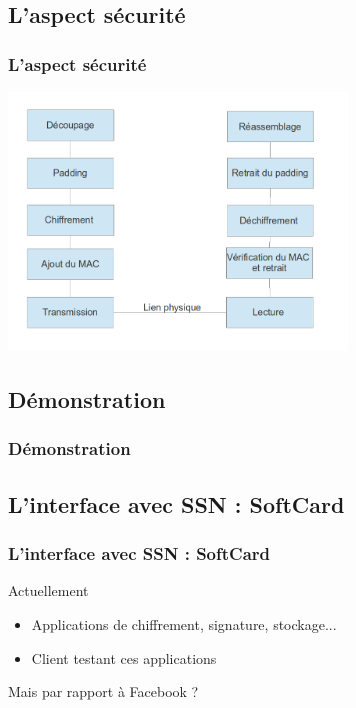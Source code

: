 \documentclass{beamer}
\begin{document}
\subsection{L'aspect sécurité}
\begin{frame}
    \frametitle{L'aspect sécurité}
    \includegraphics[width=9cm]{stack}
\end{frame}

\subsection{Démonstration}
\begin{frame}
    \frametitle{Démonstration}
    \begin{block}{}
    \end{block}
\end{frame}

\subsection{L'interface avec SSN : SoftCard}
\begin{frame}
    \frametitle{L'interface avec SSN : SoftCard}
    \begin{block}{Actuellement}
        \begin{itemize}
            \item Applications de chiffrement, signature, stockage...
            \item Client testant ces applications
        \end{itemize}
    \end{block}

    Mais par rapport à Facebook ?
\end{frame}
\end{document}

